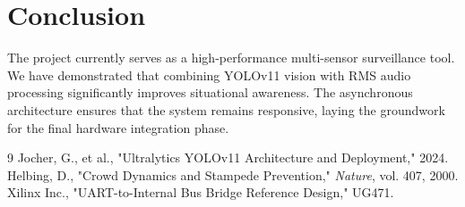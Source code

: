 \documentclass[12pt,oneside,a4paper]{book}
\begin{document}
\chapter{Conclusion}
The project currently serves as a high-performance multi-sensor surveillance tool. We have demonstrated that combining YOLOv11 vision with RMS audio processing significantly improves situational awareness. The asynchronous architecture ensures that the system remains responsive, laying the groundwork for the final hardware integration phase.

\begin{thebibliography}{9}
 Jocher, G., et al., "Ultralytics YOLOv11 Architecture and Deployment," 2024.
 Helbing, D., "Crowd Dynamics and Stampede Prevention," \textit{Nature}, vol. 407, 2000.
 Xilinx Inc., "UART-to-Internal Bus Bridge Reference Design," UG471.
\end{thebibliography}
\end{document}
